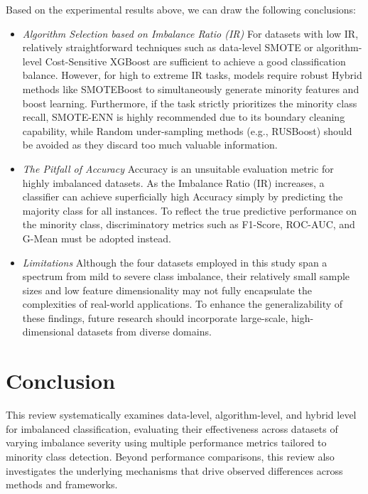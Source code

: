 \documentclass[sigconf]{acmart}
\begin{document}
Based on the experimental results above, we can draw the following conclusions: 

\begin{itemize}
    \item \textit{Algorithm Selection based on Imbalance Ratio (IR) }
          For datasets with low IR, relatively straightforward techniques such as data-level SMOTE or algorithm-level Cost-Sensitive XGBoost are sufficient to achieve a good classification balance. However, for high to extreme IR tasks, models require robust Hybrid methods like SMOTEBoost to simultaneously generate minority features and boost learning. Furthermore, if the task strictly prioritizes the minority class recall, SMOTE-ENN is highly recommended due to its boundary cleaning capability, while Random under-sampling methods (e.g., RUSBoost) should be avoided as they discard too much valuable information. 
    \item \textit{The Pitfall of Accuracy}
           Accuracy is an unsuitable evaluation metric for highly imbalanced datasets. As the Imbalance Ratio (IR) increases, a classifier can achieve superficially high Accuracy simply by predicting the majority class for all instances. To reflect the true predictive performance on the minority class, discriminatory metrics such as F1-Score, ROC-AUC, and G-Mean must be adopted instead. 
    \item \textit{Limitations} 
          Although the four datasets employed in this study span a spectrum from mild to severe class imbalance, their relatively small sample sizes and low feature dimensionality may not fully encapsulate the complexities of real-world applications. To enhance the generalizability of these findings, future research should incorporate large-scale, high-dimensional datasets from diverse domains. 
\end{itemize}

\section{Conclusion}

This review systematically examines data-level, algorithm-level, and hybrid level for imbalanced classification, evaluating their effectiveness across datasets of varying imbalance severity using multiple performance metrics tailored to minority class detection. Beyond performance comparisons, this review also investigates the underlying mechanisms that drive observed differences across methods and frameworks. 
\end{document}
